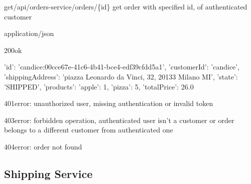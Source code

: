 \begin{apiRoute}{get}{/api/orders-service/orders/\{id\}} {get order with specified id, of authenticated customer}
	\begin{routeParameter}
	\end{routeParameter}
	\begin{routeResponse}{application/json}
		\begin{routeResponseItem}{200}{ok}
			\begin{routeResponseItemBody}
{   
    'id': 'candice:00cce67e-41c6-4b41-bce4-edf39cfdd5a1',
    'customerId': 'candice',
    'shippingAddress': 'piazza Leonardo da Vinci, 32, 20133 Milano MI',
    'state': 'SHIPPED',
    'products': {'apple': 1, 'pizza': 5},
    'totalPrice': 26.0
}
			\end{routeResponseItemBody}
		\end{routeResponseItem}
	    \begin{routeResponseItem}{401}{error: unauthorized user, missing authentication or invalid token}
    	    \begin{routeResponseItemBody}
			\end{routeResponseItemBody}
		\end{routeResponseItem}
	    \begin{routeResponseItem}{403}{error: forbidden operation, authenticated user isn't a customer or order belongs to a different customer from authenticated one}
    	    \begin{routeResponseItemBody}
		    \end{routeResponseItemBody}
	    \end{routeResponseItem}	
	    \begin{routeResponseItem}{404}{error: order not found}
    		\begin{routeResponseItemBody}
        	\end{routeResponseItemBody} 
		\end{routeResponseItem}
	\end{routeResponse}
\end{apiRoute}


\subsection{Shipping Service}

